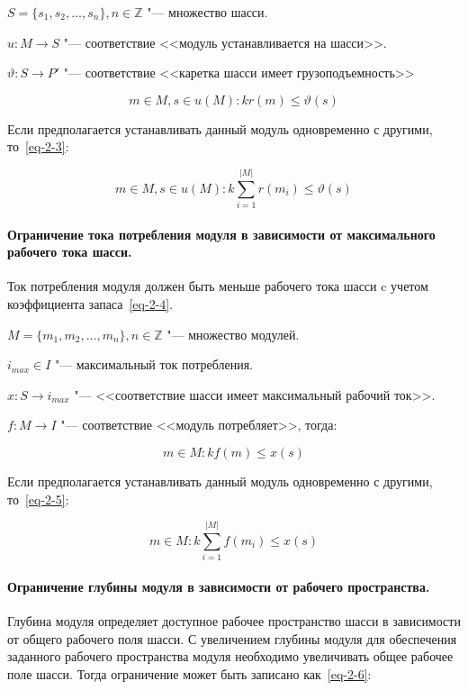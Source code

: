 \noindent $S = \{s_1, s_2, \ldots, s_n\}, n \in \mathbb{Z}$ "--- множество шасси.

\noindent $u: M \rightarrow S$ "--- соответствие <<модуль устанавливается  на шасси>>. 

\noindent $\vartheta: S \rightarrow P'$ "--- соответствие <<каретка шасси имеет грузоподъемность>> 

\begin{equation}
m \in M, s \in u(M): kr(m) \leq \vartheta(s)
\label{eq-2-2}
\end{equation}

Если предполагается устанавливать данный модуль одновременно с другими, то~\cref{eq-2-3}:

\begin{equation}
m \in M, s \in u(M): k\sum_{i=1}^{|M|}r(m_i) \leq \vartheta(s)
\label{eq-2-3}
\end{equation}

\paragraph{Ограничение тока потребления модуля в зависимости от максимального рабочего тока шасси.} Ток потребления модуля должен быть меньше рабочего тока шасси c учетом коэффициента запаса~\cref{eq-2-4}.

\noindent $M = \{m_1, m_2, \ldots, m_n\}, n \in \mathbb{Z} $ "--- множество модулей.

\noindent $i_{max} \in I$ "--- максимальный ток потребления.

\noindent $x: S \rightarrow i_{max}$ "--- <<соответствие шасси имеет максимальный рабочий ток>>.

\noindent $f: M \rightarrow I$ "--- соответствие <<модуль потребляет>>, тогда:

\begin{equation}
m \in M: kf(m) \leq x(s)
\label{eq-2-4}
\end{equation}

Если предполагается устанавливать данный модуль одновременно с другими, то~\cref{eq-2-5}:

\begin{equation}
m \in M: k\sum_{i=1}^{|M|}f(m_i) \leq x(s)
\label{eq-2-5}
\end{equation}

\paragraph{Ограничение глубины модуля в зависимости от рабочего пространства.} Глубина модуля определяет доступное рабочее пространство шасси в зависимости от общего рабочего поля шасси. С увеличением глубины модуля для обеспечения заданного рабочего пространства модуля необходимо увеличивать общее рабочее поле шасси. Тогда ограничение может быть записано как~\cref{eq-2-6}:

